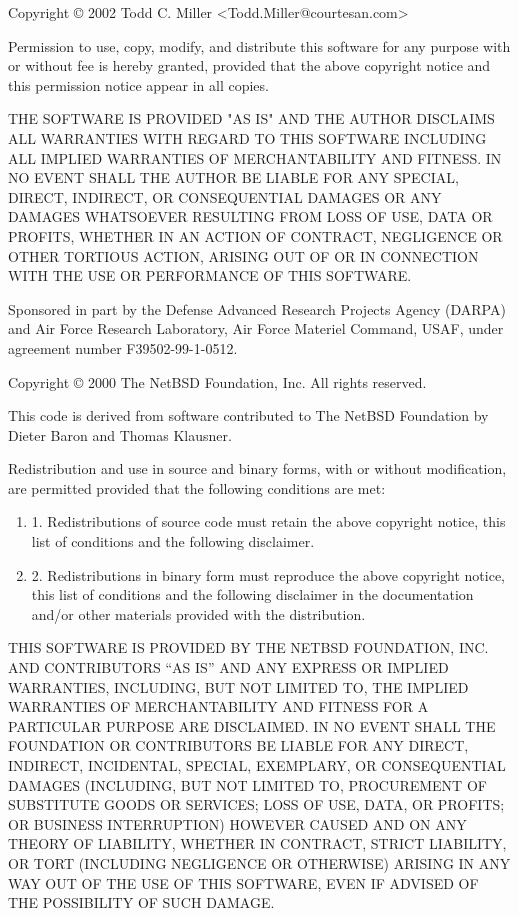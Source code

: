 \bigskip
\noindent Copyright © 2002 Todd C. Miller <Todd.Miller@courtesan.com>

\bigskip
\noindent Permission to use, copy, modify, and distribute this software for any
purpose with or without fee is hereby granted, provided that the above
copyright notice and this permission notice appear in all copies.

\bigskip
\noindent THE SOFTWARE IS PROVIDED "AS IS" AND THE AUTHOR DISCLAIMS ALL WARRANTIES
WITH REGARD TO THIS SOFTWARE INCLUDING ALL IMPLIED WARRANTIES OF
MERCHANTABILITY AND FITNESS. IN NO EVENT SHALL THE AUTHOR BE LIABLE FOR
ANY SPECIAL, DIRECT, INDIRECT, OR CONSEQUENTIAL DAMAGES OR ANY DAMAGES
WHATSOEVER RESULTING FROM LOSS OF USE, DATA OR PROFITS, WHETHER IN AN
ACTION OF CONTRACT, NEGLIGENCE OR OTHER TORTIOUS ACTION, ARISING OUT OF
OR IN CONNECTION WITH THE USE OR PERFORMANCE OF THIS SOFTWARE.

\bigskip
\noindent Sponsored in part by the Defense Advanced Research Projects
Agency (DARPA) and Air Force Research Laboratory, Air Force
Materiel Command, USAF, under agreement number F39502-99-1-0512.

\bigskip
\noindent Copyright © 2000 The NetBSD Foundation, Inc.
All rights reserved.

\bigskip
\noindent This code is derived from software contributed to The NetBSD Foundation
by Dieter Baron and Thomas Klausner.

\bigskip
\noindent Redistribution and use in source and binary forms, with or without
modification, are permitted provided that the following conditions
are met:

\begin{enumerate}
  \item   1. Redistributions of source code must retain the above copyright
   notice, this list of conditions and the following disclaimer.
  \item 2. Redistributions in binary form must reproduce the above copyright
   notice, this list of conditions and the following disclaimer in the
   documentation and/or other materials provided with the distribution.
\end{enumerate}

\noindent THIS SOFTWARE IS PROVIDED BY THE NETBSD FOUNDATION, INC. AND CONTRIBUTORS
``AS IS'' AND ANY EXPRESS OR IMPLIED WARRANTIES, INCLUDING, BUT NOT LIMITED
TO, THE IMPLIED WARRANTIES OF MER\-CHANT\-A\-BIL\-I\-TY AND FITNESS FOR A PARTICULAR
PURPOSE ARE DISCLAIMED.  IN NO EVENT SHALL THE FOUNDATION OR CONTRIBUTORS
BE LIABLE FOR ANY DIRECT, INDIRECT, INCIDENTAL, SPECIAL, EXEMPLARY, OR
CONSEQUENTIAL DAMAGES (INCLUDING, BUT NOT LIMITED TO, PROCUREMENT OF
SUBSTITUTE GOODS OR SERVICES; LOSS OF USE, DATA, OR PROFITS; OR BUSINESS
INTERRUPTION) HOWEVER CAUSED AND ON ANY THEORY OF LIABILITY, WHETHER IN
CONTRACT, STRICT LIABILITY, OR TORT (INCLUDING NEGLIGENCE OR OTHERWISE)
ARISING IN ANY WAY OUT OF THE USE OF THIS SOFTWARE, EVEN IF ADVISED OF THE
POSSIBILITY OF SUCH DAMAGE.
